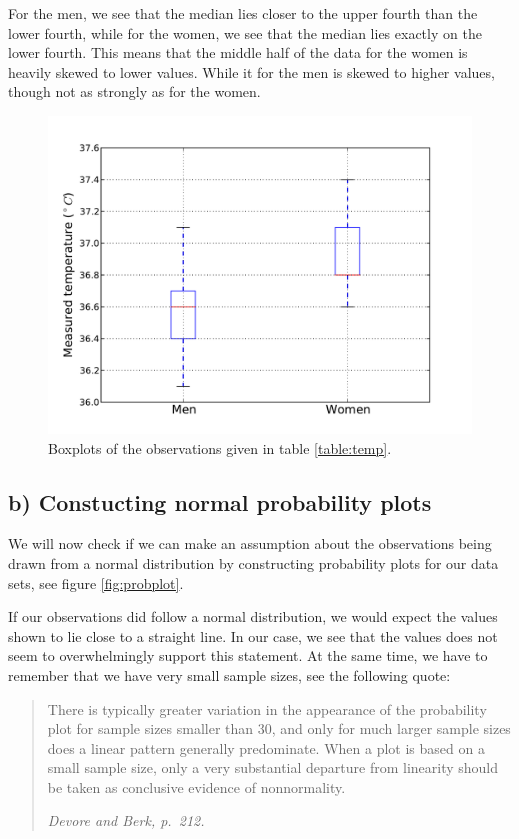 \documentclass[a4paper, 11pt, titlepage]{article}
\begin{document}
For the men, we see that the median lies closer to the upper fourth than the lower fourth, while for the women, we see that the median lies exactly on the lower fourth. This means that the middle half of the data for the women is heavily skewed to lower values. While it for the men is skewed to higher values, though not as strongly as for the women.

\begin{figure}[htpb]
\centering
\includegraphics[width=\textwidth]{boxplot.pdf}
\caption{Boxplots of the observations given in table \ref{table:temp}. \label{fig:boxplot}}
\end{figure}

\clearpage

\subsection*{b) Constucting normal probability plots}
We will now check if we can make an assumption about the observations being drawn from a normal distribution by constructing probability plots for our data sets, see figure \ref{fig:probplot}. 

If our observations did follow a normal distribution, we would expect the values shown to lie close to a straight line. In our case, we see that the values does not seem to overwhelmingly support this statement. At the same time, we have to remember that we have very small sample sizes, see the following quote:

\begin{quote} There is typically greater variation in the appearance of the probability plot for sample sizes smaller than 30, and only for much larger sample sizes does a linear pattern generally predominate. When a plot is based on a small sample size, only a very substantial departure from linearity should be taken as conclusive evidence of nonnormality.

\em Devore and Berk, p.\ 212.
\end{quote}
\end{document}
